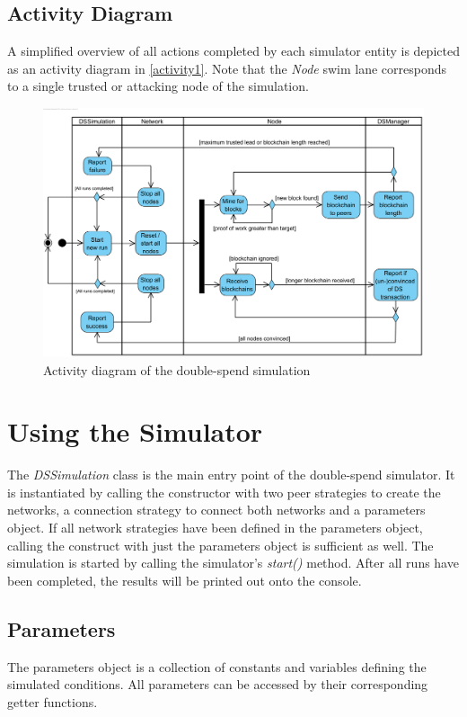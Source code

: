 \documentclass[a4paper,12pt,twoside]{report}
\begin{document}
\subsection{Activity Diagram}
A simplified overview of all actions completed by each simulator entity is depicted as an activity diagram in \autoref{activity1}. Note that the \textit{Node} swim lane corresponds to a single trusted or attacking node of the simulation.
\begin{figure}[ht]
	\centering
  \includegraphics[width=\textwidth]{Activity1.png}
	\caption{Activity diagram of the double-spend simulation}
	\label{activity1}
\end{figure}

\section{Using the Simulator}
The \textit{DSSimulation} class is the main entry point of the double-spend simulator. It is instantiated by calling the constructor with two peer strategies to create the networks, a connection strategy to connect both networks and a parameters object. If all network strategies have been defined in the parameters object, calling the construct with just the parameters object is sufficient as well. The simulation is started by calling the simulator's \textit{start()} method. After all runs have been completed, the results will be printed out onto the console. 
\subsection{Parameters} \label{params}
The parameters object is a collection of constants and variables defining the simulated conditions. All parameters can be accessed by their corresponding getter functions.
\end{document}
